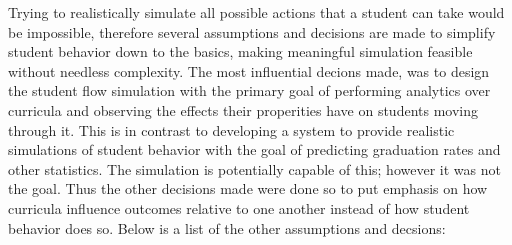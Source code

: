 \documentclass[botnum, fleqn]{unmeethesis}
\begin{document}
Trying to realistically simulate all possible actions that a student can take would be impossible, therefore several assumptions and decisions are made to simplify student behavior down to the basics, making meaningful simulation feasible without needless complexity. The most influential decions made, was to design the student flow simulation with the primary goal of performing analytics over curricula and observing the effects their properities have on students moving through it. This is in contrast to developing a system to provide realistic simulations of student behavior with the goal of predicting graduation rates and other statistics. The simulation is potentially capable of this; however it was not the goal. Thus the other decisions made were done so to put emphasis on how curricula influence outcomes relative to one another instead of how student behavior does so. Below is a list of the other assumptions and decsions:
\end{document}
